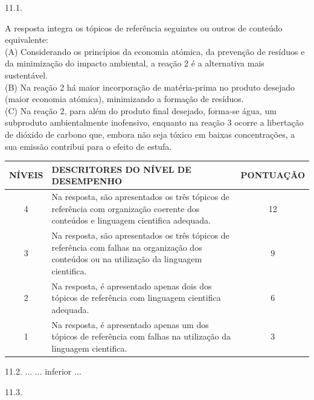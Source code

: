 \documentclass{article}
\begin{document}
\vspace{20pt}
11.1. 

				A resposta integra os tópicos de referência seguintes ou outros de conteúdo equivalente:\\
				
				(A)	Considerando os princípios da economia atómica, da prevenção de resíduos e da minimização do impacto ambiental, a reação 2 é a alternativa mais sustentável.\\
				
				(B) Na reação 2 há maior incorporação de matéria-prima no produto desejado (maior economia atómica), minimizando a formação de resíduos.\\
				
				(C)	Na reação 2, para além do produto final desejado, forma-se água, um subproduto ambientalmente inofensivo, enquanto na reação 3 ocorre a libertação de dióxido de carbono que, embora não seja tóxico em baixas concentrações, a sua emissão contribui para o efeito de estufa.\\
				
				\begin{tabular}{|c|p{}|c|}
					\hline
					NÍVEIS & DESCRITORES DO NÍVEL DE DESEMPENHO & PONTUAÇÃO \\
					\hline
					4 & Na resposta, são apresentados os três tópicos de referência com organização coerente dos conteúdos e linguagem cientifica adequada. & 12 \\
					\hline
					3 & Na resposta, são apresentados os três tópicos de referência com falhas na organização dos conteúdos ou na utilização da linguagem cientifica. & 9 \\
					\hline
					2 & Na resposta, é apresentado apenas dois dos tópicos de referência com linguagem cientifica adequada. & 6 \\
					\hline
					1 & Na resposta, é apresentado apenas um dos tópicos de referência com falhas na utilização da linguagem cientifica. & 3 \\
					\hline
				\end{tabular}

\vspace{20pt}
11.2. 
	 $\ldots$  $\ldots$ inferior $\ldots$ 

\vspace{20pt}
11.3.
\end{document}
